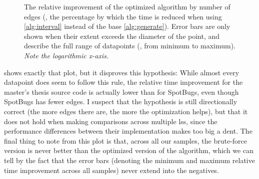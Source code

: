 \documentclass[../thesis]{subfiles}
\begin{document}
\begin{figure}
	\begin{center}
		\tikzexternaldisable
		\tikzexternalenable
	\end{center}
	\caption{The relative improvement of the optimized algorithm by number of edges (\ie, the percentage by which the time is reduced when using \cref{alg:interval} instead of the base \cref{alg:generate}).
		Error bars are only shown when their extent exceeds the diameter of the point, and describe the full range of datapoints (\ie, from minimum to maximum).
		\emph{Note the logarithmic x-axis.}
	}\label{fig:relimprov}
\end{figure}

 shows exactly that plot, but it disproves this hypothesis:
While almost every datapoint does seem to follow this rule, the relative time improvement for the master's thesis source code is actually lower than for SpotBugs, even though SpotBugs has fewer edges.
I suspect that the hypothesis is still directionally correct (the more edges there are, the more the optimization helps), but that it does not hold when making comparisons across multiple \glspl{ls}, since the performance differences between their implementation makes too big a dent.
The final thing to note from this plot is that, across all our samples, the brute-force version is never better than the optimized version of the algorithm, which we can tell by the fact that the error bars (denoting the minimum and maximum relative time improvement across all samples) never extend into the negatives.
\end{document}
